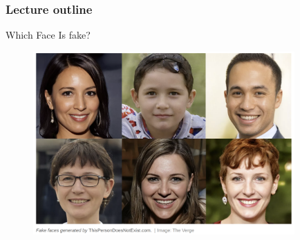
 







\begin{frame}
\frametitle{Lecture outline}
\tableofcontents
\end{frame}




    

\begin{frame} {Which Face Is fake?}

    \begin{figure}
    \centering
    \includegraphics[width=10cm]{plots/exampleGAN.png}
    \end{figure}

\end{frame}

